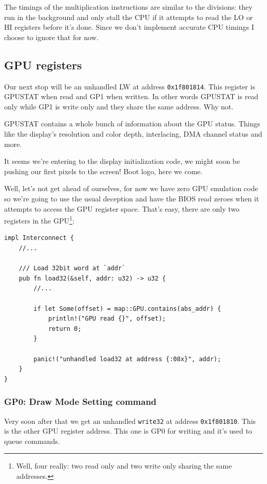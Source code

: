 \documentclass[a4paper]{article}
\newcommand{\code}[1] {\texttt{#1}}
\begin{document}
The timings of the multiplication instructions are similar to the
divisions: they run in the background and only stall the CPU if it
attempts to read the LO or HI registers before it's done. Since we
don't implement accurate CPU timings I choose to ignore that for now.

\subsection{GPU registers}

Our next stop will be an unhandled LW at address
\code{0x1f801814}. This register is GPUSTAT when read and GP1 when
written. In other words GPUSTAT is read only while GP1 is write only
and they share the same address. Why not.

GPUSTAT contains a whole bunch of information about the GPU
status. Things like the display's resolution and color depth,
interlacing, DMA channel status and more.

It seems we're entering to the display initialization code, we might
soon be pushing our first pixels to the screen! Boot logo, here we
come.

Well, let's not get ahead of ourselves, for now we have zero GPU
emulation code so we're going to use the usual deception and have the
BIOS read zeroes when it attempts to access the GPU register
space. That's easy, there are only two registers in the
GPU\footnote{Well, four really: two read only and two write only
  sharing the same addresses.}:

\begin{lstlisting}
impl Interconnect {
    //...

    /// Load 32bit word at `addr`
    pub fn load32(&self, addr: u32) -> u32 {
        //...

        if let Some(offset) = map::GPU.contains(abs_addr) {
            println!("GPU read {}", offset);
            return 0;
        }

        panic!("unhandled load32 at address {:08x}", addr);
    }
}
\end{lstlisting}

\subsubsection{GP0: Draw Mode Setting command}

Very soon after that we get an unhandled \code{write32} at address
\code{0x1f801810}. This is the other GPU register address. This one is
GP0 for writing and it's used to queue commands.
\end{document}
